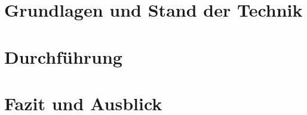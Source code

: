 \documentclass[
   ngerman          %
  ,a4paper          %
  ,12pt
  ,pdftex
]{report}
\begin{document}






\newpage
\tableofcontents           %
\listoffigures             %


\part{Grundlagen und Stand der Technik}


\part{Durchführung}



\part{Fazit und Ausblick}



\appendix



%
%

\def\refname{Literaturverzeichnis}
\printbibliography
\end{document}
